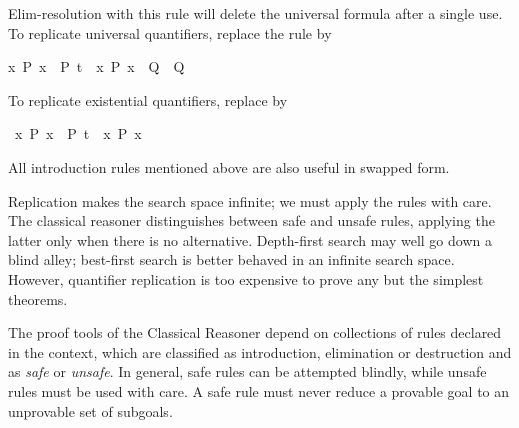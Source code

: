 \begin{isabellebody}
\begin{isamarkuptext}
  Elim-resolution with this rule will delete the universal formula
  after a single use.  To replicate universal quantifiers, replace the
  rule by \begin{isabelle}%
{}{}x{}\ P\ x\ {}\ {}P\ t\ {}\ {}x{}\ P\ x\ {}\ Q{}\ {}\ Q{}%
\end{isabelle}

  To replicate existential quantifiers, replace  by
  \begin{isabelle}%
{}{}{}\ {}{}x{}\ P\ x{}\ {}\ P\ t{}\ {}\ {}x{}\ P\ x{}%
\end{isabelle}

  All introduction rules mentioned above are also useful in swapped
  form.

  Replication makes the search space infinite; we must apply the rules
  with care.  The classical reasoner distinguishes between safe and
  unsafe rules, applying the latter only when there is no alternative.
  Depth-first search may well go down a blind alley; best-first search
  is better behaved in an infinite search space.  However, quantifier
  replication is too expensive to prove any but the simplest theorems.%
\end{isamarkuptext}%
\isamarkuptrue%
%
\isamarkuptrue%
%
\begin{isamarkuptext}%
The proof tools of the Classical Reasoner depend on
  collections of rules declared in the context, which are classified
  as introduction, elimination or destruction and as \emph{safe} or
  \emph{unsafe}.  In general, safe rules can be attempted blindly,
  while unsafe rules must be used with care.  A safe rule must never
  reduce a provable goal to an unprovable set of subgoals.


\end{isamarkuptext}
\end{isabellebody}
